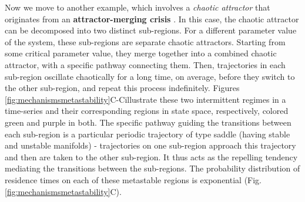 Now we move to another example, which involves a \textit{chaotic attractor} that originates from an \textbf{attractor-merging crisis} \cite{grebogi1987critical}. In this case, the chaotic attractor can be decomposed into two distinct sub-regions. For a different parameter value of the system, these sub-regions are separate chaotic attractors. Starting from some critical parameter value, they merge together into a combined chaotic attractor, with a specific pathway connecting them. Then, trajectories in each sub-region oscillate chaotically for a long time, on average, before they switch to the other sub-region, and repeat this process indefinitely. Figures \ref{fig:mechanismsmetastability}C-C\supprime illustrate these two intermittent regimes in a time-series and their corresponding regions in state space, respectively, colored green and purple in both. The specific pathway guiding the transitions between each sub-region is a particular periodic trajectory of type saddle (having stable and unstable manifolds) - trajectories on one sub-region approach this trajectory and then are taken to the other sub-region. It thus acts as the repelling tendency mediating the transitions between the sub-regions.
The probability distribution of residence times on each of these metastable regions is exponential (Fig. \ref{fig:mechanismsmetastability}C\ssupprime). 

